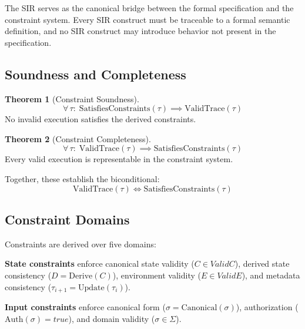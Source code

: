 \documentclass[11pt,a4paper]{article}
\theoremstyle{definition}
\newtheorem{theorem}{Theorem}[section]
\newcommand{\Derive}{\mathrm{Derive}}
\newcommand{\Canonical}{\mathrm{Canonical}}
\newcommand{\Auth}{\mathrm{Auth}}
\newcommand{\ValidTrace}{\mathrm{ValidTrace}}
\newcommand{\SatisfiesConstraints}{\mathrm{SatisfiesConstraints}}
\begin{document}
The SIR serves as the canonical bridge between the formal specification and the constraint system. Every SIR construct must be traceable to a formal semantic definition, and no SIR construct may introduce behavior not present in the specification.

\subsection{Soundness and Completeness}
\label{subsec:constraint-soundness-completeness}

\begin{theorem}[Constraint Soundness]
\label{thm:constraint-soundness}
\begin{equation}
\forall\, \tau:\; \SatisfiesConstraints(\tau) \implies \ValidTrace(\tau)
\end{equation}
No invalid execution satisfies the derived constraints.
\end{theorem}

\begin{theorem}[Constraint Completeness]
\label{thm:constraint-completeness}
\begin{equation}
\forall\, \tau:\; \ValidTrace(\tau) \implies \SatisfiesConstraints(\tau)
\end{equation}
Every valid execution is representable in the constraint system.
\end{theorem}

Together, these establish the biconditional:
\begin{equation}
\label{eq:constraint-biconditional}
\ValidTrace(\tau) \iff \SatisfiesConstraints(\tau)
\end{equation}

\subsection{Constraint Domains}
\label{subsec:constraint-domains}

Constraints are derived over five domains:

\noindent\textbf{State constraints} enforce canonical state validity ($C \in \mathit{ValidC}$), derived state consistency ($D = \Derive(C)$), environment validity ($E \in \mathit{ValidE}$), and metadata consistency ($\tau_{i+1} = \mathrm{Update}(\tau_i)$).

\noindent\textbf{Input constraints} enforce canonical form ($\sigma = \Canonical(\sigma)$), authorization ($\Auth(\sigma) = \mathit{true}$), and domain validity ($\sigma \in \Sigma$).
\end{document}
